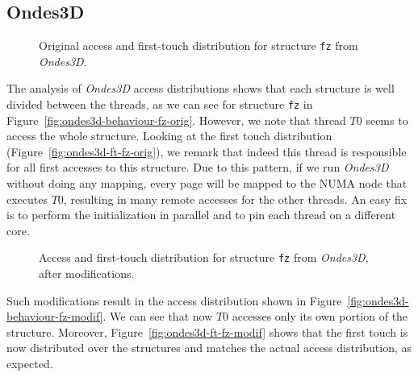 \subsection{Ondes3D}
\label{sec:exp-ondes3d}

\begin{figure}[htb]
    \centering

    \caption{Original access and first-touch distribution for structure
        \texttt{fz} from \emph{Ondes3D}.}
    \label{fig:ondes3d-orig}
\end{figure}

The analysis of \emph{Ondes3D} access distributions shows that each
structure is well divided between the threads, as we can see for structure \texttt{fz} in Figure~\ref{fig:ondes3d-behaviour-fz-orig}.
However, we note that thread $T0$ seems to access the whole structure. Looking at the first touch distribution (Figure~\ref{fig:ondes3d-ft-fz-orig}), we
remark that indeed this thread is responsible for all first accesses to this structure. Due to
this pattern, if we run \emph{Ondes3D} without doing any mapping, every page
will be mapped to the NUMA node that executes $T0$, resulting in many remote accesses for the other threads. An easy fix is to
perform the initialization in parallel and to pin each thread on a different core.

\begin{figure}[htb]
    \centering

    \caption{Access and first-touch distribution  for structure
        \texttt{fz} from \emph{Ondes3D}, after modifications.}
    \label{fig:ondes3d-modif}
\end{figure}

Such modifications result in the access distribution shown in Figure~\ref{fig:ondes3d-behaviour-fz-modif}. We can see that now $T0$ accesses only
its own portion of the structure. Moreover, Figure~\ref{fig:ondes3d-ft-fz-modif} shows that the first touch is now distributed
over the structures and matches the actual access distribution, as expected.


